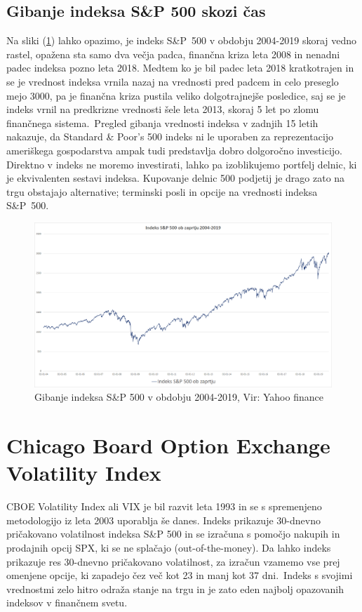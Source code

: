 \documentclass[12pt,a4paper]{amsart}
\theoremstyle{definition} %
\theoremstyle{plain} %
\begin{document}
\subsection{Gibanje indeksa S\&P 500 skozi čas}
Na sliki (\ref{Graf 1}) lahko opazimo, je indeks S\&P~500 v obdobju 2004-2019 skoraj vedno rastel, opažena sta samo dva večja padca, finančna kriza leta 2008 in nenadni padec indeksa pozno leta 2018. 
Medtem ko je bil padec leta 2018 kratkotrajen in se je vrednost indeksa vrnila nazaj na vrednosti pred padcem in celo preseglo mejo 3000, pa je finančna kriza pustila veliko dolgotrajnejše posledice, saj se je indeks vrnil na predkrizne vrednosti šele leta 2013, skoraj 5 let po zlomu finančnega sistema.\
Pregled gibanja vrednosti indeksa v zadnjih 15 letih nakazuje, da Standard \& Poor's 500 indeks ni le uporaben za reprezentacijo ameriškega gospodarstva ampak tudi predstavlja dobro dolgoročno investicijo. Direktno v indeks ne moremo investirati, lahko pa izoblikujemo portfelj delnic, ki je ekvivalenten sestavi indeksa. Kupovanje delnic 500 podjetij je drago zato na trgu obstajajo alternative; terminski posli in opcije na vrednosti indeksa S\&P~500.
\begin{figure}[!h]
\centering
\includegraphics[width = 15 cm]{Grafi/SPX_2004-2019.png}
\caption{Gibanje indeksa S\&P 500 v obdobju 2004-2019, Vir: Yahoo finance}
\label{Graf 1}
\end{figure}


\newpage
\section{Chicago Board Option Exchange Volatility Index}
CBOE Volatility Index ali VIX je bil razvit leta 1993 in se s spremenjeno metodologijo iz leta 2003 uporablja še danes. Indeks prikazuje 30-dnevno pričakovano volatilnost indeksa S\&P 500  in se izračuna s pomočjo nakupih in prodajnih opcij SPX, ki se ne splačajo (out-of-the-money). Da lahko indeks prikazuje res 30-dnevno pričakovano volatilnost, za izračun vzamemo vse prej omenjene opcije, ki zapadejo čez več kot 23 in manj kot 37 dni.\
Indeks s svojimi vrednostmi zelo hitro odraža stanje na trgu in je zato eden najbolj opazovanih indeksov v finančnem svetu.
\end{document}
